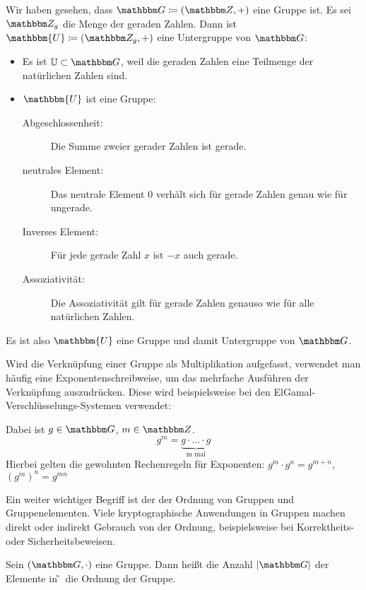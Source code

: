 \begin{beispiel}
  Wir haben gesehen, dass $\G \coloneqq (\Z{}, +)$ eine Gruppe ist. Es sei
  $\Z{g}$ die Menge der geraden Zahlen. Dann ist $\mathbbm{U} \coloneqq (\Z{g},
  +)$ eine Untergruppe von $\G$:
  \begin{itemize}
  \item Es ist $\mathbb{U} \subset \G$, weil die geraden Zahlen eine
     Teilmenge der natürlichen Zahlen sind.
  \item $\mathbbm{U}$ ist eine Gruppe:
    \begin{description}
    \item[Abgeschlossenheit:] Die Summe zweier gerader Zahlen ist gerade.
    \item[neutrales Element:] Das neutrale Element $0$ verhält sich für
      gerade Zahlen genau wie für ungerade.
    \item[Inverses Element:] Für jede gerade Zahl $x$ ist $-x$ auch
      gerade.
    \item[Assoziativität:] Die Assoziativität gilt für gerade Zahlen
      genauso wie für alle natürlichen Zahlen.
    \end{description}
  \end{itemize}
  Es ist also $\mathbbm{U}$ eine Gruppe und damit Untergruppe von $\G$.
\end{beispiel}

Wird die Verknüpfung einer Gruppe als Multiplikation aufgefasst,
verwendet man häufig eine Exponentenschreibweise, um das mehrfache
Ausführen der Verknüpfung auszudrücken. Diese wird beispielsweise bei den
ElGamal-Verschlüsselungs-Systemen verwendet:

\begin{definition}
 Dabei ist $g\in \G$, $m \in \Z{}$.
\[ g^m = \underbrace{g \cdot \dotsc \cdot g}_{\text{m mal}} \]
Hierbei gelten die gewohnten Rechenregeln für Exponenten: $g^m\cdot g^n =
g^{m+n}$, $(g^m)^n = g^{mn}$
\end{definition}
Ein weiter wichtiger Begriff ist der der Ordnung von Gruppen und
Gruppenelementen. Viele kryptographische Anwendungen in Gruppen machen
direkt oder indirekt Gebrauch von der Ordnung, beispielsweise bei
Korrektheits- oder Sicherheitsbeweisen. 
\begin{definition}
  Sein $(\G, \cdot)$ eine Gruppe. Dann heißt die Anzahl $|\G|$ der Elemente in
  \G~die Ordnung der Gruppe.
\end{definition}

